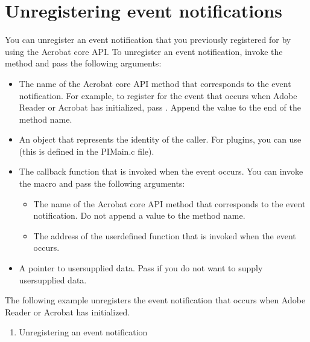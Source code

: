 \documentclass[letterpaper,12pt,english,openany,oneside]{sphinxmanual}
\begin{document}
\section{Unregistering event notifications}
\label{\detokenize{Plugins_Notification:unregistering-event-notifications}}
You can unregister an event notification that you previously registered for by using the Acrobat core API. To unregister an event notification, invoke the  method and pass the following arguments:
\begin{itemize}
\item {} 
The name of the Acrobat core API method that corresponds to the event notification. For example, to register for the event that occurs when Adobe Reader or Acrobat has initialized, pass . Append the value  to the end of the method name.

\item {} 
An  object that represents the identity of the caller. For plugins, you can use  (this is defined in the PIMain.c file).

\item {} 
The callback function that is invoked when the event occurs. You can invoke the  macro and pass the following arguments:
\begin{itemize}
\item {} 
The name of the Acrobat core API method that corresponds to the event notification. Do not append a value to the method name.

\item {} 
The address of the user\sphinxhyphen{}defined function that is invoked when the event occurs.

\end{itemize}

\item {} 
A pointer to user\sphinxhyphen{}supplied data. Pass  if you do not want to supply user\sphinxhyphen{}supplied data.

\end{itemize}

The following example unregisters the event notification that occurs when Adobe Reader or Acrobat has initialized.
\begin{enumerate}
%
\item {} 
Unregistering an event notification

\end{enumerate}
\end{document}
